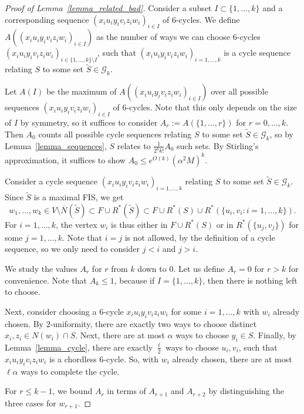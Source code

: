 \documentclass{article}
\theoremstyle{plain}
\theoremstyle{remark}
\theoremstyle{plain}
\numberwithin{equation}{section}
\begin{document}
	\begin{proof}[Proof of Lemma~\ref{lemma_related_bad}]
		Consider a subset $I\subset\{1,\ldots,k\}$ and a corresponding sequence $(x_iu_iy_iv_iz_iw_i)_{i\in I}$ of $6$-cycles. We define $A((x_iu_iy_iv_iz_iw_i)_{i\in I})$ as the number of ways we can choose $6$-cycles $(x_iu_iy_iv_iz_iw_i)_{i\in\{1,\ldots,k\}\setminus I}$, such that $(x_iu_iy_iv_iz_iw_i)_{i=1,\ldots,k}$ is a cycle sequence relating $S$ to some set $\widetilde{S}\in\mathcal{G}_k$.
		
		Let $A(I)$ be the maximum of $A((x_iu_iy_iv_iz_iw_i)_{i\in I})$ over all possible sequences $(x_iu_iy_iv_iz_iw_i)_{i\in I}$ of $6$-cycles. Note that this only depends on the size of $I$ by symmetry, so it suffices to consider $A_r:=A(\{1,\ldots,r\})$ for $r=0,\ldots,k$. Then $A_0$ counts all possible cycle sequences relating $S$ to some set $\widetilde{S}\in\mathcal{G}_k$, so by Lemma~\ref{lemma_sequences}, $S$ relates to $\tfrac1{2^kk!}A_0$ such sets. By Stirling's approximation, it suffices to show $A_0\leq e^{O(k)}(\alpha^2M)^k$.
		
		Consider a cycle sequence $(x_iu_iy_iv_iz_iw_i)_{i=1,\ldots,k}$ relating $S$ to some set $\widetilde{S}\in\mathcal{G}_k$. Since $\widetilde{S}$ is a maximal FIS, we get $$w_1,\ldots,w_k\in V\setminus\overline{N}(\widetilde{S})\subset F\cup R^*(\widetilde{S})\subset F\cup R^*(S)\cup R^*(\{u_i,v_i:i=1,\ldots,k\}).$$ For $i=1,\ldots,k$, the vertex $w_i$ is thus either in $F\cup R^*(S)$ or in $R^*(\{u_j,v_j\})$ for some $j=1,\ldots,k$. Note that $i=j$ is not allowed, by the definition of a cycle sequence, so we only need to consider $j<i$ and $j>i$.
		
		We study the values $A_r$ for $r$ from $k$ down to $0$. Let us define $A_r=0$ for $r>k$ for convenience. Note that $A_k\leq1$, because if $I=\{1,\ldots,k\}$, then there is nothing left to choose.
		
		Next, consider choosing a $6$-cycle $x_iu_iy_iv_iz_iw_i$ for some $i=1,\ldots,k$ with $w_i$ already chosen. By $2$-uniformity, there are exactly two ways to choose distinct $x_i,z_i\in N(w_i)\cap S$. Next, there are at most $\alpha$ ways to choose $y_i\in S$. Finally, by Lemma~\ref{lemma_cycle}, there are exactly $\tfrac{\ell}{2}$ ways to choose $u_i,v_i$, such that $x_iu_iy_iv_iz_iw_i$ is a chordless $6$-cycle. So, with $w_i$ already chosen, there are at most $\ell\alpha$ ways to complete the cycle.
		
		For $r\leq k-1$, we bound $A_r$ in terms of $A_{r+1}$ and $A_{r+2}$ by distinguishing the three cases for $w_{r+1}$.
		

\end{proof}
\end{document}
